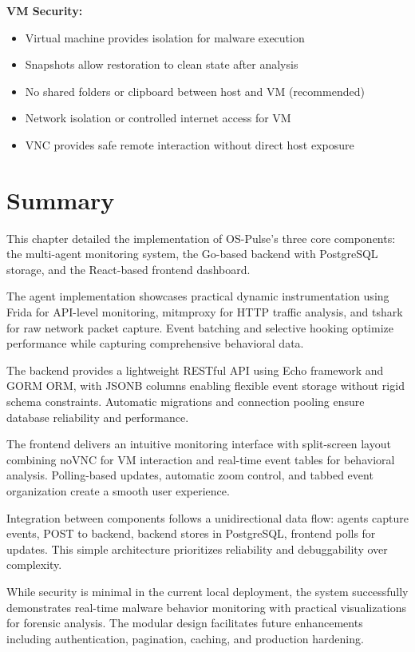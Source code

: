 \textbf{VM Security:}
\begin{itemize}
    \item Virtual machine provides isolation for malware execution
    \item Snapshots allow restoration to clean state after analysis
    \item No shared folders or clipboard between host and VM (recommended)
    \item Network isolation or controlled internet access for VM
    \item VNC provides safe remote interaction without direct host exposure
\end{itemize}

\section{Summary}

This chapter detailed the implementation of OS-Pulse's three core components: the multi-agent monitoring system, the Go-based backend with PostgreSQL storage, and the React-based frontend dashboard.

The agent implementation showcases practical dynamic instrumentation using Frida for API-level monitoring, mitmproxy for HTTP traffic analysis, and tshark for raw network packet capture. Event batching and selective hooking optimize performance while capturing comprehensive behavioral data.

The backend provides a lightweight RESTful API using Echo framework and GORM ORM, with JSONB columns enabling flexible event storage without rigid schema constraints. Automatic migrations and connection pooling ensure database reliability and performance.

The frontend delivers an intuitive monitoring interface with split-screen layout combining noVNC for VM interaction and real-time event tables for behavioral analysis. Polling-based updates, automatic zoom control, and tabbed event organization create a smooth user experience.

Integration between components follows a unidirectional data flow: agents capture events, POST to backend, backend stores in PostgreSQL, frontend polls for updates. This simple architecture prioritizes reliability and debuggability over complexity.

While security is minimal in the current local deployment, the system successfully demonstrates real-time malware behavior monitoring with practical visualizations for forensic analysis. The modular design facilitates future enhancements including authentication, pagination, caching, and production hardening.